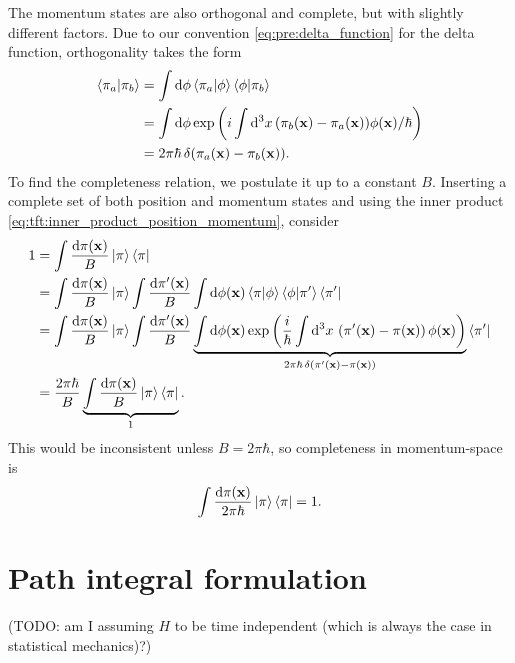 The momentum states are also orthogonal and complete, but with slightly different factors.
Due to our convention \eqref{eq:pre:delta_function} for the delta function, orthogonality takes the form
\begin{equation}
\begin{split}
	\braket{\pi_a | \pi_b} &= \int \mathop{}\!\mathrm{d} \phi \braket{\pi_a | \phi} \braket{\phi | \pi_b} \\
	                       &= \int \mathop{}\!\mathrm{d} \phi \exp \left( i \int \mathop{}\!\mathrm{d}^3 x \, (\pi_b(\mathbf{x}) - \pi_a(\mathbf{x})) \phi(\mathbf{x}) / \hbar \right) \\
						   &= 2 \pi \hbar \, \delta(\pi_a(\mathbf{x}) - \pi_b(\mathbf{x})) .
\end{split}
\end{equation}
To find the completeness relation, we postulate it up to a constant $B$.
Inserting a complete set of both position and momentum states and using the inner product \eqref{eq:tft:inner_product_position_momentum}, consider
\begin{equation}
\begin{split}
	1 &= \int \frac{\dif \pi(\vec{x})}{B} \ket{\pi} \bra{\pi} \\
	  &= \int \frac{\dif \pi(\vec{x})}{B} \ket{\pi} \int \frac{\dif \pi'(\vec{x})}{B} \int \dif \phi(\vec{x}) \braket{\pi | \phi} \braket{\phi | \pi'} \bra{\pi'} \\
	  &= \int \frac{\dif \pi(\vec{x})}{B} \ket{\pi} \int \frac{\dif \pi'(\vec{x})}{B} \underbrace{\int \dif \phi(\vec{x}) \exp \left( \frac{i}{\hbar} \int \dif^3 x \, \left( \pi'(\vec{x}) - \pi(\vec{x}) \right) \phi(\vec{x}) \right)}_{2 \pi \hbar \, \delta(\pi'(\vec{x}) - \pi(\vec{x}))} \bra{\pi'} \\
	  &= \frac{2 \pi \hbar}{B} \underbrace{\int \frac{\dif \pi(\vec{x})}{B} \ket{\pi} \bra{\pi}}_{1} .
\end{split}
\end{equation}
This would be inconsistent unless $B = 2 \pi \hbar$, so completeness in momentum-space is
\begin{equation}
	\int \frac{\mathop{}\!\mathrm{d} \pi(\mathbf{x})}{2 \pi \hbar} \ket{\pi} \bra{\pi} = 1 .
\end{equation}

\section{Path integral formulation}

(TODO: am I assuming $H$ to be time independent (which is always the case in statistical mechanics)?)

